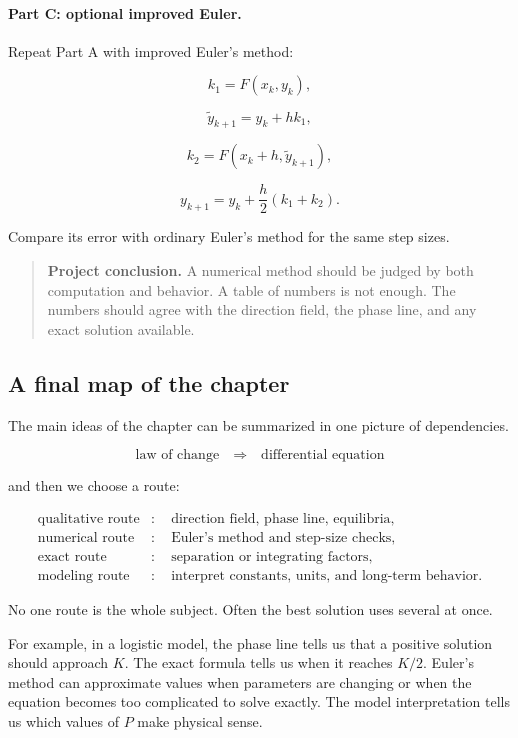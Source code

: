 \paragraph{Part C: optional improved Euler.}
Repeat Part A with improved Euler's method:

\[
k_1=F(x_k,y_k),
\]

\[
\widetilde y_{k+1}=y_k+hk_1,
\]

\[
k_2=F(x_k+h,\widetilde y_{k+1}),
\]

\[
y_{k+1}=y_k+\frac h2(k_1+k_2).
\]

Compare its error with ordinary Euler's method for the same step sizes.

\begin{quote}
\textbf{Project conclusion.}
A numerical method should be judged by both computation and behavior.  A table of
numbers is not enough.  The numbers should agree with the direction field, the phase
line, and any exact solution available.
\end{quote}

\subsection{A final map of the chapter}
\label{subsec:final-map-differential-equations}

The main ideas of the chapter can be summarized in one picture of dependencies.

\[
\text{law of change}
\quad\Longrightarrow\quad
\text{differential equation}
\]

and then we choose a route:

\[
\begin{aligned}
\text{qualitative route} &:\quad \text{direction field, phase line, equilibria},\\
\text{numerical route} &:\quad \text{Euler's method and step-size checks},\\
\text{exact route} &:\quad \text{separation or integrating factors},\\
\text{modeling route} &:\quad \text{interpret constants, units, and long-term behavior}.
\end{aligned}
\]

No one route is the whole subject.  Often the best solution uses several at once.

For example, in a logistic model, the phase line tells us that a positive solution should
approach \(K\).  The exact formula tells us when it reaches \(K/2\).  Euler's method
can approximate values when parameters are changing or when the equation becomes too
complicated to solve exactly.  The model interpretation tells us which values of \(P\)
make physical sense.

